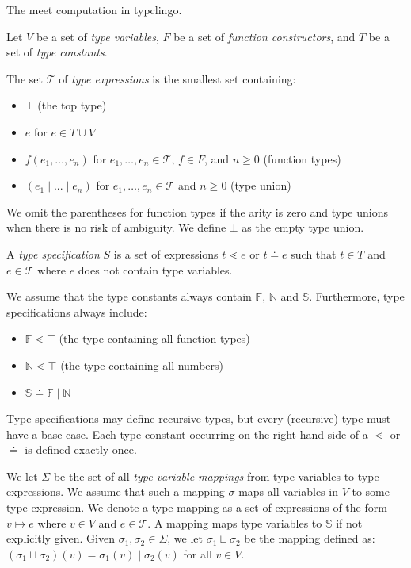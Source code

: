 \documentclass{amsart}
\begin{document}
\newcommand\meet{\mathrm{meet}}

The meet computation in typclingo.

Let $V$ be a set of \emph{type variables},
$F$ be a set of \emph{function constructors}, and
$T$ be a set of \emph{type constants}.

The set $\mathcal{T}$ of \emph{type expressions} is the smallest set containing:
\begin{itemize}
	\item $\top$ (the top type)
	\item $e$ for $e \in T \cup V$
	\item $f(e_1,\dots,e_n)$ for $e_1,\dots,e_n \in \mathcal{T}$, $f \in F$, and $n \geq 0$ (function types)
	\item $(e_1 \mid ... \mid e_n)$ for $e_1,\dots,e_n \in \mathcal{T}$ and $n \geq 0$ (type union)
\end{itemize}

We omit the parentheses for function types if the arity is zero
and type unions when there is no risk of ambiguity.
We define $\bot$ as the empty type union.

A \emph{type specification} $S$ is a set of expressions $t \lessdot e$ or $t \doteq e$
such that $t \in T$ and $e \in \mathcal{T}$ where $e$ does not contain type variables.

We assume that the type constants always contain $\mathbb{F}$, $\mathbb{N}$ and $\mathbb{S}$.
Furthermore, type specifications always include:
\begin{itemize}
	\item $\mathbb{F} \lessdot \top$ (the type containing all function types)
	\item $\mathbb{N} \lessdot \top$ (the type containing all numbers)
	\item $\mathbb{S} \doteq \mathbb{F} \mid \mathbb{N}$
\end{itemize}

Type specifications may define recursive types, but every (recursive) type must have a base case.
Each type constant occurring on the right-hand side of a $\lessdot$ or $\doteq$ is defined exactly once.


We let $\Sigma$ be the set of all \emph{type variable mappings} from type variables to type expressions.
We assume that such a mapping $\sigma$ maps all variables in $V$ to some type expression.
We denote a type mapping as a set of expressions of the form $v \mapsto e$ where $v \in V$ and $e \in \mathcal{T}$.
A mapping maps type variables to $\mathbb{S}$ if not explicitly given.
Given $\sigma_1, \sigma_2 \in \Sigma$, we let $\sigma_1 \sqcup \sigma_2$ be the mapping defined as:
$(\sigma_1 \sqcup \sigma_2)(v) = \sigma_1(v) \mid \sigma_2(v)$ for all $v \in V$.
\end{document}
